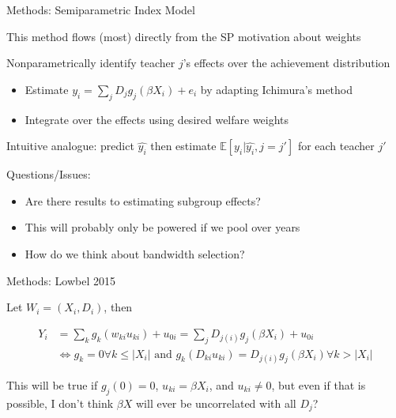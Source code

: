 \documentclass[t,aspectratio=169,11pt]{beamer}
\newenvironment{wideitemize}{\itemize\addtolength{\itemsep}{14pt}}{\enditemize}
\begin{document}
\begin{frame}{Methods: Semiparametric Index Model}

\begin{wideitemize}

    \item This method flows (most) directly from the SP motivation about weights
    
    \item  Nonparametrically identify teacher $j$'s effects over the achievement distribution
    \begin{itemize}
        \item Estimate $y_i = \sum _j D_j g_j(\beta X_i) +e_i$  by adapting Ichimura's method \citep{ichimura1993semiparametric}
        \item Integrate over the effects using desired welfare weights
    \end{itemize}
    
    \item Intuitive analogue: predict $\hat{y_i}$ then estimate $\mathbb{E}[y_i|\hat{y_i},j=j']$ for each teacher $j'$

    \item Questions/Issues:
    \begin{itemize}
         \item Are there results to estimating subgroup effects?
         \item This will probably only be powered if we pool over years
         \item How do we think about bandwidth selection? 
    \end{itemize}


\end{wideitemize}

\vfill
\begin{flushleft}

\hyperlink{next}{}
\end{flushleft}
\end{frame}

\begin{frame}{Methods: Lowbel 2015}

\begin{wideitemize}
\item Let $W_i = (X_i,D_i)$, then 

\begin{align*}
    Y_i &= \sum_k g_k (w_{ki} u_{ki}) +u_{0i} = \sum _j D_{j(i)} g_j(\beta X_i) +u_{0i} \\
        & \iff g_k = 0 \forall k\leq |X_i| \text{ and } g_k(D_{ki} u_{ki}) = D_{j(i)} g_j(\beta X_i) \forall k>|X_i| 
\end{align*}

\item This will be true if $g_j(0)=0$, $u_{ki}=\beta X_i$, and $u_{ki}\neq 0$, but even if that is possible, I don't think $\beta X$ will ever be uncorrelated with all $D_j$?
\end{wideitemize}


\end{frame}
\end{document}
